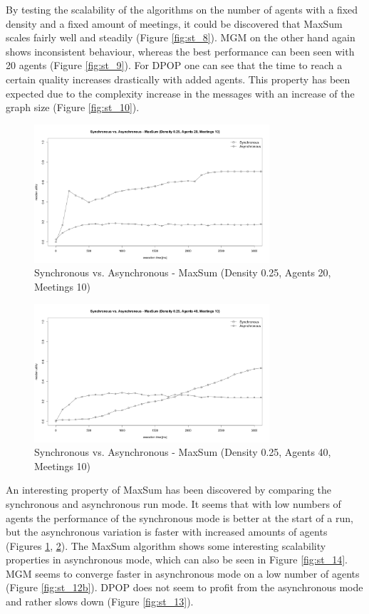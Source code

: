 By testing the scalability of the algorithms on the number of agents with a fixed density and a fixed amount of meetings, it could be discovered that MaxSum scales fairly well and steadily (Figure \ref{fig:st_8}). MGM on the other hand again shows inconsistent behaviour, whereas the best performance can been seen with 20 agents (Figure \ref{fig:st_9}). For DPOP one can see that the time  to reach a certain quality increases drastically with added agents. This property has been expected due to the complexity increase in the messages with an increase of the graph size (Figure \ref{fig:st_10}).
\begin{figure}[H]
\centering
\includegraphics[width=330px]{graphics/experiments/static/st_11}
\caption{Synchronous vs. Asynchronous - MaxSum (Density 0.25, Agents 20, Meetings 10)}
\label{fig:st_11}
\end{figure}
\begin{figure}[H]
\centering
\includegraphics[width=330px]{graphics/experiments/static/st_12}
\caption{Synchronous vs. Asynchronous - MaxSum (Density 0.25, Agents 40, Meetings 10)}
\label{fig:st_12}
\end{figure}

An interesting property of MaxSum has been discovered by comparing the synchronous and asynchronous run mode. It seems that with low numbers of agents the performance of the synchronous mode is better at the start of a run, but the asynchronous variation is faster with increased amounts of agents (Figures \ref{fig:st_11}, \ref{fig:st_12}). The MaxSum algorithm shows some interesting scalability properties in asynchronous mode, which can also be seen in Figure \ref{fig:st_14}. MGM seems to converge faster in asynchronous mode on a low number of agents (Figure \ref{fig:st_12b}). DPOP does not seem to profit from the asynchronous mode and rather slows down (Figure \ref{fig:st_13}).

